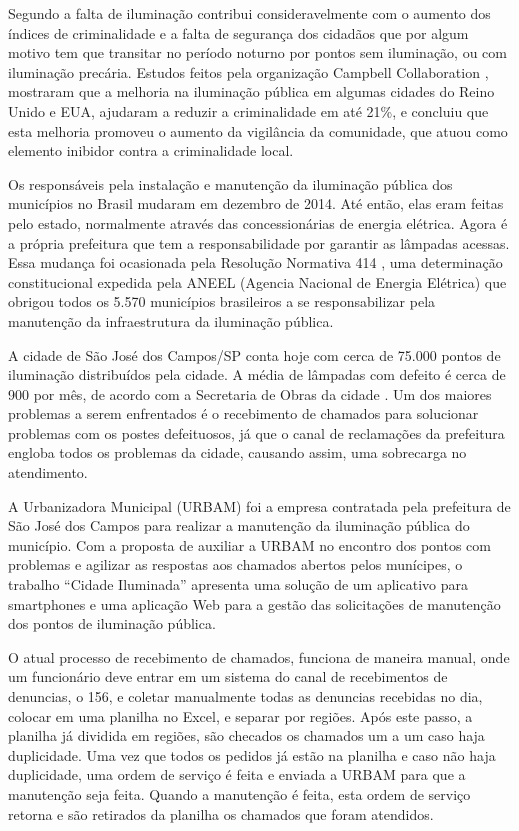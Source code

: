 \documentclass[
	article,			%
	11pt,				%
	oneside,			%
	a4paper,			%
	english,			%
	brazil,				%
	sumario=tradicional
	]{abntex2}
\begin{document}
Segundo \cite{aver} a falta de iluminação contribui consideravelmente com o aumento
dos índices de criminalidade e a falta de segurança dos cidadãos que por algum
motivo tem que transitar no período noturno por pontos sem iluminação, ou com
iluminação precária. Estudos feitos pela organização Campbell Collaboration \cite{newton},
mostraram que a melhoria na iluminação pública em algumas cidades do Reino Unido e EUA, ajudaram a
reduzir a criminalidade em até 21\%, e concluiu que esta melhoria promoveu o aumento da vigilância
da comunidade, que atuou como elemento inibidor contra a criminalidade local.

Os responsáveis pela instalação e manutenção da iluminação pública dos municípios
no Brasil mudaram em dezembro de 2014. Até então, elas eram feitas pelo estado,
normalmente através das concessionárias de energia elétrica. Agora é a própria
prefeitura que tem a responsabilidade por garantir as lâmpadas acessas. Essa
mudança foi ocasionada pela Resolução Normativa 414 \cite{aneel414}, uma determinação
constitucional expedida pela ANEEL (Agencia Nacional de Energia Elétrica) que
obrigou todos os 5.570 municípios brasileiros a se responsabilizar pela
manutenção da infraestrutura da iluminação pública.

A cidade de São José dos Campos/SP conta hoje com cerca de 75.000 pontos de iluminação
distribuídos pela cidade. A média de lâmpadas com defeito é cerca de 900 por mês, de
acordo com a Secretaria de Obras da cidade \cite{secretariaobras}. Um dos maiores problemas a
serem enfrentados é o recebimento de chamados para solucionar problemas com os
postes defeituosos, já que o canal de reclamações da prefeitura engloba todos
os problemas da cidade, causando assim, uma sobrecarga no atendimento.

A Urbanizadora Municipal (URBAM) foi a empresa contratada pela prefeitura de
São José dos Campos para realizar a manutenção da iluminação pública do município.
Com a proposta de auxiliar a URBAM no encontro dos pontos com problemas e agilizar
as respostas aos chamados abertos pelos munícipes, o trabalho “Cidade Iluminada”
apresenta uma solução de um aplicativo para smartphones e uma aplicação Web para
a gestão das solicitações de manutenção dos pontos de iluminação pública.

O atual processo de recebimento de chamados, funciona de maneira manual, onde
um funcionário deve entrar em um sistema do canal de recebimentos de denuncias,
o 156, e coletar manualmente todas as denuncias recebidas no dia, colocar em uma
planilha no Excel, e separar por regiões. Após este passo, a planilha já
dividida em regiões, são checados os chamados um a um caso haja duplicidade.
Uma vez que todos os pedidos já estão na planilha e caso não haja duplicidade,
uma ordem de serviço é feita e enviada a URBAM para que a manutenção seja feita.
Quando a manutenção é feita, esta ordem de serviço retorna e são retirados da
planilha os chamados que foram atendidos.
\end{document}
